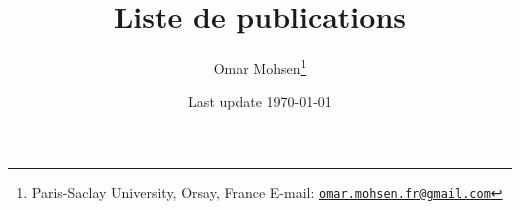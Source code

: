 \documentclass[a4paper, 13pt]{article}
\begin{document}
\title{Liste de publications}
\author{Omar Mohsen\footnote{{\footnotesize
Paris-Saclay University, Orsay, France
\vskip-2pt E-mail: \href{mailto:omar.mohsen.fr@gmail.com}{\texttt{omar.mohsen.fr@gmail.com}}}}}
\date{Last update \today}
\maketitle
\nocite{MohsenBlowup}
  \nocite{MohsenGrpTangent}
  \nocite{MohsenIndex}
  \nocite{MohsenIndexMuens}
  \nocite{MohsenTangentCone}
  \nocite{MohsenMaxHypo}
  \nocite{MohsenChernSimons}
  \nocite{MohsenWitten}
  \nocite{MohsenConnesShwartz}
 \nocite{MohsenConvolutionSingularFoliations}
 \nocite{MohsenWodizki}


\begin{refcontext}[sorting=nyt]
\printbibliography[heading=none]
\end{refcontext}
\end{document}
